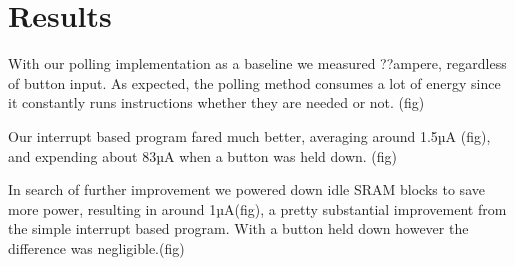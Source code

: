 \chapter{Results}

With our polling implementation as a baseline we measured ??ampere, regardless of button input. As expected, the polling method consumes a lot of energy since it constantly runs instructions whether they are needed or not. (fig)

Our interrupt based program fared much better, averaging around 1.5µA (fig), and expending about 83µA when a button was held down. (fig)

In search of further improvement we powered down idle SRAM blocks to save more power, resulting in around 1µA(fig), a pretty substantial improvement from the simple interrupt based program. With a button held down however the difference was negligible.(fig)
